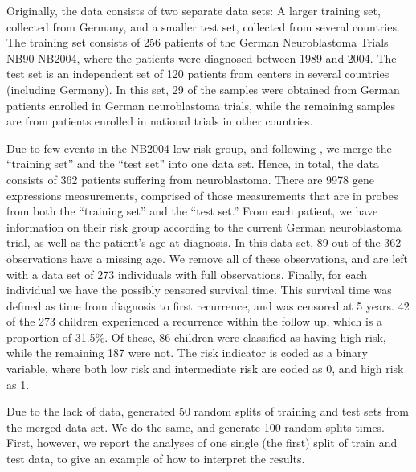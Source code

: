 Originally, the data consists of two separate data sets:
A larger training set, collected from Germany, and a smaller test set, collected from several countries.
The training set consists of 256 patients of the German Neuroblastoma Trials NB90-NB2004, where the patients were diagnosed between 1989 and 2004.
The test set is an independent set of 120 patients from centers in several countries (including Germany).
In this set, 29 of the samples were obtained from German patients enrolled in German neuroblastoma trials, while the remaining samples are from patients enrolled in national trials in other countries.

Due to few events in the NB2004 low risk group, and following \citet{bovelstad2009}, we merge the ``training set'' and the ``test set'' into one data set.
Hence, in total, the data consists of 362 patients suffering from neuroblastoma.
There are 9978 gene expressions measurements, comprised of those measurements that are in probes from both the ``training set'' and the ``test set.''
From each patient, we have information on their risk group according to the current German neuroblastoma trial, as well as the patient's age at diagnosis.
In this data set, 89 out of the 362 observations have a missing age.
We remove all of these observations, and are left with a data set of 273 individuals with full observations.
Finally, for each individual we have the possibly censored survival time.
This survival time was defined as time from diagnosis to first recurrence, and was censored at 5 years.
42 of the 273 children experienced a recurrence within the follow up, which is a proportion of 31.5\%.
Of these, 86 children were classified as having high-risk, while the remaining 187 were not.
The risk indicator is coded as a binary variable, where both low risk and intermediate risk are coded as 0, and high risk as 1.

Due to the lack of data, \citet{bovelstad2009} generated 50 random splits of training and test sets from the merged data set.
We do the same, and generate 100 random splits times.
First, however, we report the analyses of one single (the first) split of train and test data, to give an example of how to interpret the results.

